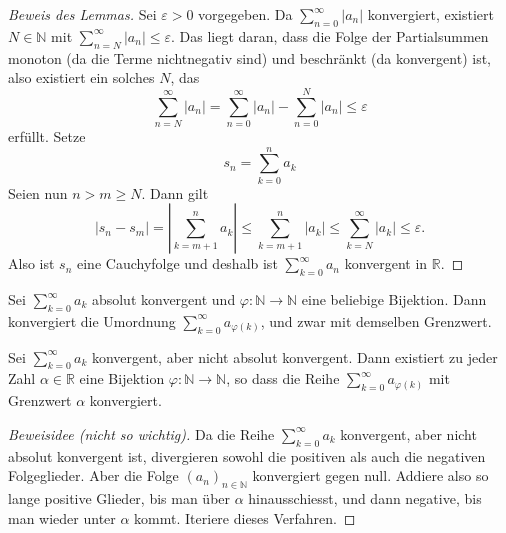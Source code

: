 \documentclass[../main.tex]{subfiles}
\begin{document}
\begin{proof}[Beweis des Lemmas]
  Sei $\varepsilon > 0$ vorgegeben. Da
  $\sum_{n=0}^{\infty} |a_n|$ 
  konvergiert, existiert $N \in \mathbb{N}$ mit
  $\sum_{n=N}^{\infty} |a_n| \leq \varepsilon$.
  Das liegt daran, dass die Folge der
  Partialsummen monoton (da die Terme nichtnegativ sind)
  und beschränkt (da konvergent) ist,
  also existiert ein solches $N$, das
  \[
    \sum_{n=N}^{\infty} |a_n| = \sum_{n=0}^{\infty} |a_n|
    - \sum_{n=0}^{N} |a_n| \leq \varepsilon
  \]
  erfüllt. Setze 
  \[
    s_n = \sum_{k=0}^{n} a_k
  \]
  Seien  nun $n > m \geq N$. Dann gilt
  \[
    |s_n - s_m|  = \left| \sum_{k=m+1}^{n} a_k \right|
                 \leq \sum_{k=m+1}^{n} |a_k| 
                 \leq \sum_{k=N}^{\infty} |a_k| 
                 \leq \varepsilon.
  \]
  Also ist $s_n$ eine 
  Cauchyfolge und deshalb ist $\sum_{k=0}^{\infty} a_n$ konvergent
  in $\mathbb{R}$.
\end{proof}

\begin{theorem}\label{thm:umordnung}
  Sei $\sum_{k=0}^{\infty} a_k$ absolut konvergent
  und $\varphi \colon \mathbb{N} \to \mathbb{N}$ eine
  beliebige Bijektion.
  Dann konvergiert die
  Umordnung
  $\sum_{k=0}^{\infty} a_{\varphi(k)}$, und
  zwar mit demselben Grenzwert.
\end{theorem}


\begin{zusatz}
  Sei $\sum_{k=0}^{\infty} a_k$ konvergent,
  aber nicht absolut konvergent.
  Dann existiert zu jeder Zahl
  $\alpha \in \mathbb{R}$ eine
  Bijektion $\varphi \colon \mathbb{N} \to \mathbb{N}$,
  so dass die Reihe $\sum_{k=0}^{\infty} a_{\varphi(k)}$ 
  mit Grenzwert $\alpha$ konvergiert.
\end{zusatz}

\begin{proof}[Beweisidee (nicht so wichtig)]
  Da die Reihe $\sum_{k=0}^{\infty} a_k$ konvergent,
  aber nicht absolut konvergent ist,
  divergieren sowohl die positiven als auch die negativen
  Folgeglieder. Aber die Folge ${(a_{n})}_{n \in \mathbb{N}}$
  konvergiert gegen null. Addiere also so lange
  positive Glieder, bis man über $\alpha$ hinausschiesst,
  und dann negative, bis man wieder unter $\alpha$ kommt.
  Iteriere dieses Verfahren.
\end{proof}
\end{document}
